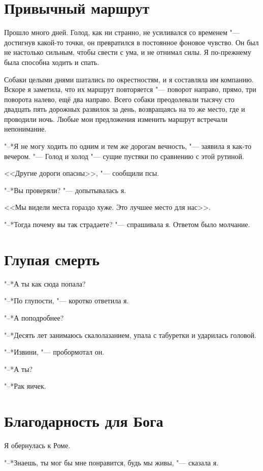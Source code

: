\section{Привычный маршрут}

Прошло много дней.
Голод, как ни странно, не усиливался со временем "--- достигнув какой-то точки, он превратился в постоянное фоновое чувство.
Он был не настолько сильным, чтобы свести с ума, и не отнимал силы.
Я по-прежнему была способна ходить и спать.

Собаки целыми днями шатались по окрестностям, и я составляла им компанию.
Вскоре я заметила, что их маршрут повторяется "--- поворот направо, прямо, три поворота налево, ещё два направо.
Всего собаки преодолевали тысячу сто двадцать пять дорожных развилок за день, возвращаясь на то же место, где и проводили ночь.
Любые мои предложения изменить маршрут встречали непонимание.

"--*Я не могу ходить по одним и тем же дорогам вечность, "--- заявила я как-то вечером.
"--- Голод и холод "--- сущие пустяки по сравнению с этой рутиной.

<<Другие дороги опасны>>, "--- сообщили псы.

"--*Вы проверяли? "--- допытывалась я.

<<Мы видели места гораздо хуже.
Это лучшее место для нас>>.

"--*Тогда почему вы так страдаете? "--- спрашивала я.
Ответом было молчание.

\section{Глупая смерть}

"--*А ты как сюда попала?

"--*По глупости, "--- коротко ответила я.

"--*А поподробнее?

"--*Десять лет занимаюсь скалолазанием, упала с табуретки и ударилась головой.

"--*Извини, "--- пробормотал он.

"--*А ты?

"--*Рак яичек.

\section{Благодарность для Бога}

Я обернулась к Роме.

"--*Знаешь, ты мог бы мне понравится, будь мы живы, "--- сказала я.

